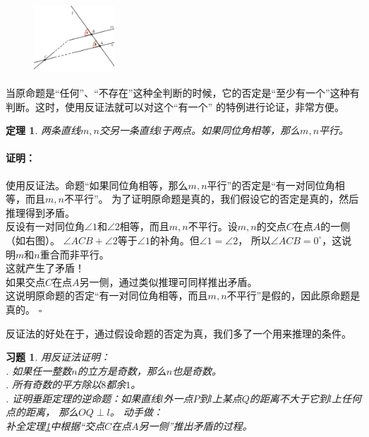 \documentclass[12pt,UTF8]{ctexbook}
\newtheorem{tm}{定理}[section]
\newenvironment{proof2}{\paragraph{\textbf{证明：}}}{\hfill$\square$}
\newtheorem{xt}{习题}[section]
\begin{document}
\begin{figure} %
    \vspace{10pt}
    \includegraphics[width=0.27\textwidth]{tu/反证法1.png}
\end{figure}
当原命题是“任何”、“不存在”这种全判断的时候，它的否定是“至少有一个”这种有判断。这时，使用反证法就可以对这个“有一个”
的特例进行论证，非常方便。

\begin{tm}\label{tm:2-0-0}
    两条直线$m,n$交另一条直线$l$于两点。如果同位角相等，那么$m,n$平行。
\end{tm}
\begin{proof2}
    使用反证法。命题“如果同位角相等，那么$m,n$平行”的否定是“有一对同位角相等，而且$m,n$不平行”。
    为了证明原命题是真的，我们假设它的否定是真的，然后推理得到矛盾。\\
    反设有一对同位角$\angle 1$和$\angle 2$相等，而且$m,n$不平行。设$m,n$的交点$C$在点$A$的一侧（如右图）。
    $\angle ACB + \angle 2$等于$\angle 1$的补角。但$\angle 1 = \angle 2$，
    所以$\angle ACB = 0^\circ$，这说明$m$和$n$重合而非平行。\\
    这就产生了矛盾！\\
    如果交点$C$在点$A$另一侧，通过类似推理可同样推出矛盾。\\
    这说明原命题的否定“有一对同位角相等，而且$m,n$不平行”是假的，因此原命题是真的。
\end{proof2}

反证法的好处在于，通过假设命题的否定为真，我们多了一个用来推理的条件。

\begin{xt}
    用反证法证明：\\
    . 如果任一整数$n$的立方是奇数，那么$n$也是奇数。\\
    . 所有奇数的平方除以$8$都余$1$。\\
    . 证明垂距定理的逆命题：如果直线$l$外一点$P$到$l$上某点$Q$的距离不大于它到$l$上任何点的距离，
    那么$OQ \perp l$。
    动手做：\\
    \indent 补全定理\ref{tm:2-0-0}中根据“交点$C$在点$A$另一侧”推出矛盾的过程。
\end{xt}
\end{document}
